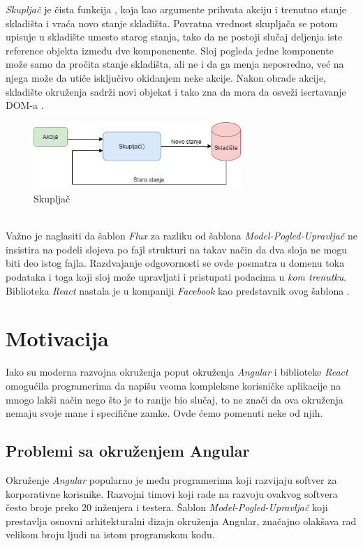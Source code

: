 \documentclass[12pt,oneside]{memoir}
\begin{document}
\emph{Skupljač} je čista funkcija \cite{functionalProgramming}, koja kao argumente
prihvata akciju i trenutno stanje skladišta i vraća novo stanje skladišta.
Povratna vrednost skupljača se potom upisuje u skladište umesto starog stanja, tako da ne postoji slučaj deljenja iste reference objekta
između dve komponenente. Sloj pogleda jedne komponente može samo da pročita stanje skladišta, ali ne i da ga menja neposredno, već na njega može da utiče
isključivo okidanjem neke akcije. Nakon obrade akcije, skladište okruženja sadrži novi objekat i tako zna da mora da osveži iscrtavanje DOM-a \cite{DOM}.
\begin{figure}[!ht]
  \centering
  \includegraphics[width=0.7\textwidth]{slike/Reducer.png}
  \caption{Skupljač}
  \label{fig:reducer}
\end{figure}
\\
Važno je naglasiti da šablon \emph{Flux} za razliku od šablona \emph{Model-Pogled-Upravljač} ne insistira
na podeli slojeva po fajl strukturi na takav način da dva sloja ne mogu biti deo istog fajla.
Razdvajanje odgovornosti se ovde posmatra u domenu toka podataka i toga koji sloj može
upravljati i pristupati podacima u \emph{kom trenutku}. Biblioteka \emph{React} nastala je u kompaniji \emph{Facebook} kao predstavnik ovog šablona \cite{React}.
\chapter{Motivacija}\label{chap:motivacija}
Iako su moderna razvojna okruženja poput okruženja \emph{Angular} i biblioteke \emph{React} omogućila
programerima da napišu veoma kompleksne korisničke aplikacije na mnogo lakši način nego što je to ranije bio slučaj,
to ne znači da ova okruženja nemaju svoje mane i specifične zamke. Ovde ćemo pomenuti neke od njih.
\section{Problemi sa okruženjem Angular}
Okruženje \emph{Angular} popularno je među programerima koji razvijaju softver za korporativne korisnike.
Razvojni timovi koji rade na razvoju ovakvog softvera često broje preko 20 inženjera i testera.
Šablon \emph{Model-Pogled-Upravljač} koji prestavlja osnovni arhitekturalni dizajn okruženja Angular,
značajno olakšava rad velikom broju ljudi na istom programskom kodu.
\end{document}

